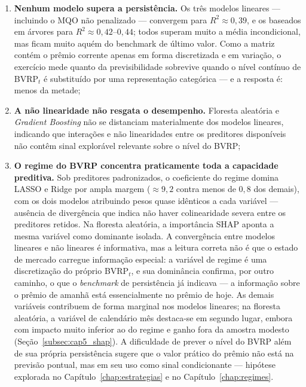 \begin{enumerate}
    \item \textbf{Nenhum modelo supera a persistência.} Os três modelos lineares
    --- incluindo o MQO não penalizado --- convergem para $R^2 \approx 0{,}39$, e os
    baseados em árvores para $R^2 \approx 0{,}42\text{--}0{,}44$; todos superam muito
    a média incondicional, mas ficam muito aquém do benchmark de último valor. Como
    a matriz contém o prêmio corrente apenas em forma discretizada e em variação, o exercício mede quanto da previsibilidade sobrevive quando o nível contínuo de BVRP$_t$ é substituído por uma representação categórica --- e a resposta é: menos da metade;

    \item \textbf{A não linearidade não resgata o desempenho.} Floresta aleatória e
    \textit{Gradient Boosting} não se distanciam materialmente dos modelos lineares,
    indicando que interações e não linearidades entre os preditores disponíveis não
    contêm sinal explorável relevante sobre o nível do BVRP;

    \item \textbf{O regime do BVRP concentra praticamente toda a capacidade preditiva.} Sob preditores padronizados, o coeficiente do regime domina LASSO e Ridge por ampla margem ($\approx 9{,}2$ contra menos de $0{,}8$ dos demais), com os dois modelos atribuindo pesos quase idênticos a cada variável --- ausência de divergência que indica não haver colinearidade severa entre os preditores retidos. Na floresta aleatória, a importância SHAP aponta a mesma variável como dominante isolada. A convergência entre modelos lineares e não lineares é informativa, mas a leitura correta não é que o estado de mercado carregue informação especial: a variável de regime é uma discretização do próprio BVRP$_t$, e sua dominância confirma, por outro caminho, o que o \emph{benchmark} de persistência já indicava --- a informação sobre o prêmio de amanhã está essencialmente no prêmio de hoje. As demais variáveis contribuem de forma marginal nos modelos lineares; na floresta
aleatória, a variável de calendário mês destaca-se em segundo lugar, embora com
impacto muito inferior ao do regime e ganho fora da amostra modesto
(Seção~\ref{subsec:cap5_shap}). A dificuldade de prever o nível do BVRP além de sua própria persistência sugere que o valor prático do prêmio não está na previsão pontual, mas em seu uso como sinal condicionante --- hipótese explorada no Capítulo~\ref{chap:estrategias} e no Capítulo~\ref{chap:regimes}.
\end{enumerate}

